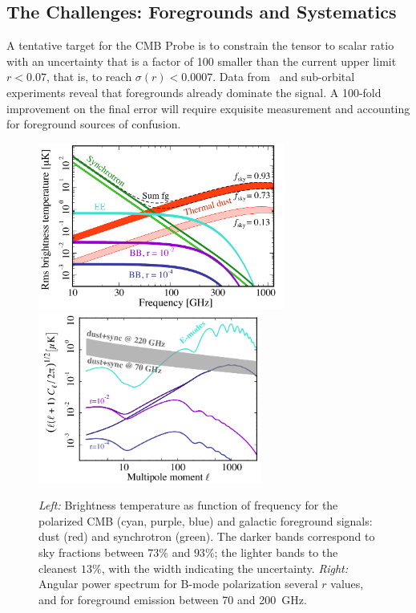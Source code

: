 \subsection{The Challenges: Foregrounds and Systematics}
\label{sec:foregrounds_systematics}

\vspace{-0.05in}

A tentative target for the CMB Probe is to constrain the tensor to scalar ratio with an 
uncertainty that is a factor of 100 smaller than the current upper limit $r < 0.07$, that is, to reach 
$\sigma(r) <0.0007$. Data from \planck\ and 
sub-orbital experiments reveal that foregrounds already dominate the signal. A 100-fold improvement 
on the final error will require exquisite measurement and accounting for foreground sources 
of confusion. 
\begin{figure}[ht!]
\vspace{-0.15in}
\hspace{-0.2in}
\begin{center}
\includegraphics[width=3.2in]{Figures/overview_pol_v4_fsky_noplanck.pdf}
\includegraphics[width=2.9in]{Figures/cmb_vs_foreground.pdf}
\end{center}
\vspace{-0.25in}
\caption{\small \setlength{\baselineskip}{0.95\baselineskip}
{\it Left:} Brightness temperature as function of frequency for the polarized CMB (cyan, purple, blue)
and galactic foreground signals: dust (red) and synchrotron (green). The darker bands correspond to
sky fractions between $73\%$ and $93\%$; the lighter bands to the cleanest $13\%$, with the width 
indicating the uncertainty. {\it Right:} Angular power spectrum for B-mode polarization 
several $r$ values, and for foreground emission between 70 and 200~GHz.}
\label{fig:frequency}
\vspace{-0.05in}
\end{figure}

